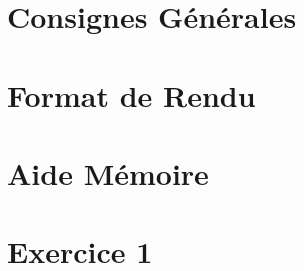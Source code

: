 \documentclass[12pt,a4paper]{article}
\begin{document}
\maketitle





\newpage

\tableofcontents

\newpage

\section{Consignes Générales}

\bigskip



\newpage

\section{Format de Rendu}
\label{sec:FormatDeRendu}

\vspace*{1cm}



\newpage

\section{Aide Mémoire}
\label{sec:AideMemoire}

\vspace*{1cm}



\newpage


%
%
%
%


\section{Exercice 1}
\end{document}
